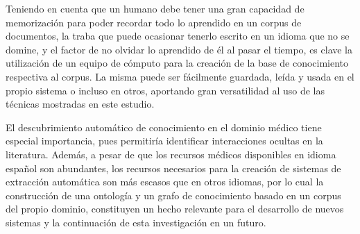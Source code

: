 Teniendo en cuenta que un humano debe tener una gran capacidad de memorización para poder recordar todo lo aprendido en un corpus de documentos, la traba que puede ocasionar tenerlo escrito en un idioma que no se domine, y el factor de no olvidar lo aprendido de él al pasar el tiempo, es clave la utilización de un equipo de cómputo para la creación de la base de conocimiento respectiva al corpus. La misma puede ser fácilmente guardada, leída y usada en el propio sistema o incluso en otros, aportando gran versatilidad al uso de las técnicas mostradas en este estudio.

El descubrimiento automático de conocimiento en el dominio médico tiene especial importancia, pues permitiría identificar interacciones ocultas en la literatura. Además, a pesar de que los recursos médicos disponibles en idioma español son abundantes, los recursos necesarios para la creación de sistemas de extracción automática son más escasos que en otros idiomas, por lo cual la construcción de una ontología y un grafo de conocimiento basado en un corpus del propio dominio, constituyen un hecho relevante para el desarrollo de nuevos sistemas y la continuación de esta investigación en un futuro.